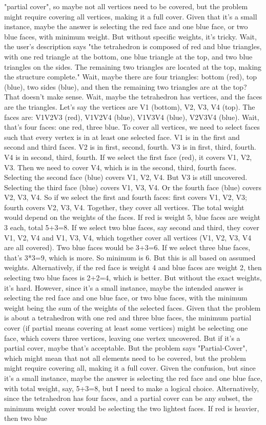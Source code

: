 "partial cover", so maybe not all vertices need to be covered, but the problem might require covering all vertices, making it a full cover. Given that it's a small instance, maybe the answer is selecting the red face and one blue face, or two blue faces, with minimum weight. But without specific weights, it's tricky. Wait, the user's description says "the tetrahedron is composed of red and blue triangles, with one red triangle at the bottom, one blue triangle at the top, and two blue triangles on the sides. The remaining two triangles are located at the top, making the structure complete." Wait, maybe there are four triangles: bottom (red), top (blue), two sides (blue), and then the remaining two triangles are at the top? That doesn't make sense. Wait, maybe the tetrahedron has vertices, and the faces are the triangles. Let's say the vertices are V1 (bottom), V2, V3, V4 (top). The faces are: V1V2V3 (red), V1V2V4 (blue), V1V3V4 (blue), V2V3V4 (blue). Wait, that's four faces: one red, three blue. To cover all vertices, we need to select faces such that every vertex is in at least one selected face. V1 is in the first and second and third faces. V2 is in first, second, fourth. V3 is in first, third, fourth. V4 is in second, third, fourth. If we select the first face (red), it covers V1, V2, V3. Then we need to cover V4, which is in the second, third, fourth faces. Selecting the second face (blue) covers V1, V2, V4. But V3 is still uncovered. Selecting the third face (blue) covers V1, V3, V4. Or the fourth face (blue) covers V2, V3, V4. So if we select the first and fourth faces: first covers V1, V2, V3; fourth covers V2, V3, V4. Together, they cover all vertices. The total weight would depend on the weights of the faces. If red is weight 5, blue faces are weight 3 each, total 5+3=8. If we select two blue faces, say second and third, they cover V1, V2, V4 and V1, V3, V4, which together cover all vertices (V1, V2, V3, V4 are all covered). Two blue faces would be 3+3=6. If we select three blue faces, that's 3*3=9, which is more. So minimum is 6. But this is all based on assumed weights. Alternatively, if the red face is weight 4 and blue faces are weight 2, then selecting two blue faces is 2+2=4, which is better. But without the exact weights, it's hard. However, since it's a small instance, maybe the intended answer is selecting the red face and one blue face, or two blue faces, with the minimum weight being the sum of the weights of the selected faces. Given that the problem is about a tetrahedron with one red and three blue faces, the minimum partial cover (if partial means covering at least some vertices) might be selecting one face, which covers three vertices, leaving one vertex uncovered. But if it's a partial cover, maybe that's acceptable. But the problem says "Partial-Cover", which might mean that not all elements need to be covered, but the problem might require covering all, making it a full cover. Given the confusion, but since it's a small instance, maybe the answer is selecting the red face and one blue face, with total weight, say, 5+3=8, but I need to make a logical choice. Alternatively, since the tetrahedron has four faces, and a partial cover can be any subset, the minimum weight cover would be selecting the two lightest faces. If red is heavier, then two blue 